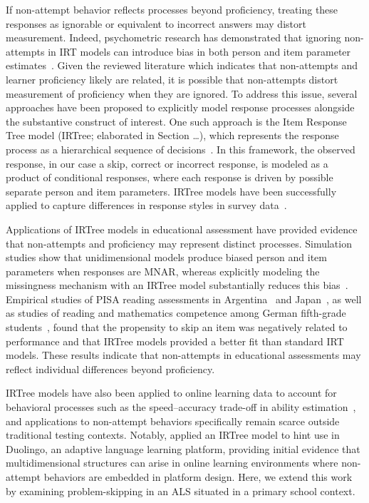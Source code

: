 \documentclass[11pt]{article}
\begin{document}
If non-attempt behavior reflects processes beyond proficiency, treating these responses as ignorable or equivalent to incorrect answers may distort measurement. Indeed, psychometric research has demonstrated that ignoring non-attempts in IRT models can introduce bias in both person and item parameter estimates~\parencite{finch2008estimation, mislevy1996missing, pohl2014dealing, holman2005modelling, debeer2017modeling}. Given the reviewed literature which indicates that non-attempts and learner proficiency likely are related, it is possible that non-attempts distort measurement of proficiency when they are ignored. To address this issue, several approaches have been proposed to explicitly model response processes alongside the substantive construct of interest. One such approach is the Item Response Tree model (IRTree; elaborated in Section \dots), which represents the response process as a hierarchical sequence of decisions~\parencite{bockenholt2012modeling, de2012irtrees, thissen2013two}. In this framework, the observed response, in our case a skip, correct or incorrect response, is modeled as a product of conditional responses, where each response is driven by possible separate person and item parameters. IRTree models have been successfully applied to capture differences in response styles in survey data~\parencite{bockenholt2017response, thissen2013two}.

Applications of IRTree models in educational assessment have provided evidence that non-attempts and proficiency may represent distinct processes. Simulation studies show that unidimensional models produce biased person and item parameters when responses are MNAR, whereas explicitly modeling the missingness mechanism with an IRTree model substantially reduces this bias~\parencite{debeer2017modeling}. Empirical studies of PISA reading assessments in Argentina~\parencite{debeer2017modeling} and Japan~\parencite{okumura2014empirical}, as well as studies of reading and mathematics competence among German fifth-grade students~\parencite{pohl2014dealing}, found that the propensity to skip an item was negatively related to performance and that IRTree models provided a better fit than standard IRT models. These results indicate that non-attempts in educational assessments may reflect individual differences beyond proficiency. 


IRTree models have also been applied to online learning data to account for behavioral processes such as the speed–accuracy trade-off in ability estimation~\parencite{coomans2016distinguishing, hofman2018fast}, and applications to non-attempt behaviors specifically remain scarce outside traditional testing contexts. Notably, \textcite{bolsinova2022measurement} applied an IRTree model to hint use in Duolingo, an adaptive language learning platform, providing initial evidence that multidimensional structures can arise in online learning environments where non-attempt behaviors are embedded in platform design. Here, we extend this work by examining problem-skipping in an ALS situated in a primary school context. 
\end{document}
